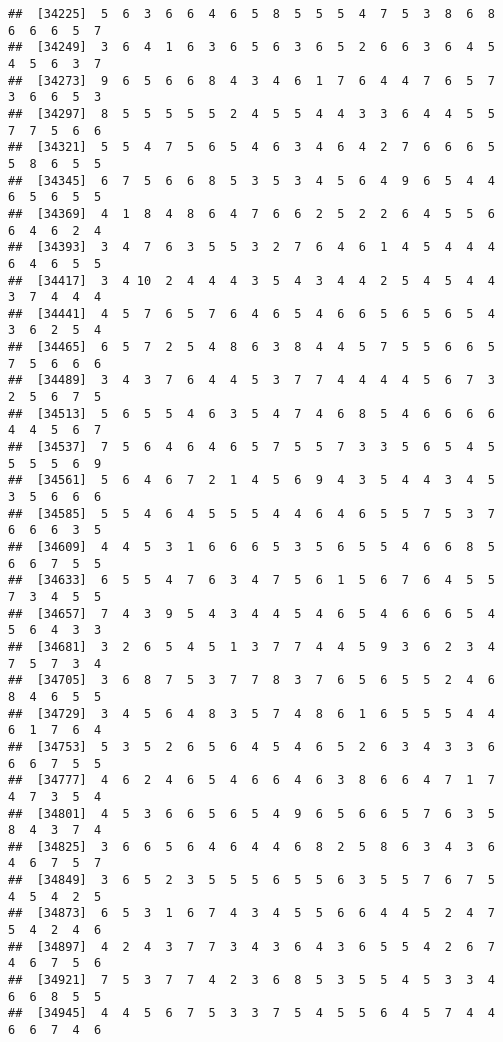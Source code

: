 \documentclass[
]{book}
\begin{document}
\begin{verbatim}
##  [34225]  5  6  3  6  6  4  6  5  8  5  5  5  4  7  5  3  8  6  8  6  6  6  5  7
##  [34249]  3  6  4  1  6  3  6  5  6  3  6  5  2  6  6  3  6  4  5  4  5  6  3  7
##  [34273]  9  6  5  6  6  8  4  3  4  6  1  7  6  4  4  7  6  5  7  3  6  6  5  3
##  [34297]  8  5  5  5  5  5  2  4  5  5  4  4  3  3  6  4  4  5  5  7  7  5  6  6
##  [34321]  5  5  4  7  5  6  5  4  6  3  4  6  4  2  7  6  6  6  5  5  8  6  5  5
##  [34345]  6  7  5  6  6  8  5  3  5  3  4  5  6  4  9  6  5  4  4  6  5  6  5  5
##  [34369]  4  1  8  4  8  6  4  7  6  6  2  5  2  2  6  4  5  5  6  6  4  6  2  4
##  [34393]  3  4  7  6  3  5  5  3  2  7  6  4  6  1  4  5  4  4  4  6  4  6  5  5
##  [34417]  3  4 10  2  4  4  4  3  5  4  3  4  4  2  5  4  5  4  4  3  7  4  4  4
##  [34441]  4  5  7  6  5  7  6  4  6  5  4  6  6  5  6  5  6  5  4  3  6  2  5  4
##  [34465]  6  5  7  2  5  4  8  6  3  8  4  4  5  7  5  5  6  6  5  7  5  6  6  6
##  [34489]  3  4  3  7  6  4  4  5  3  7  7  4  4  4  4  5  6  7  3  2  5  6  7  5
##  [34513]  5  6  5  5  4  6  3  5  4  7  4  6  8  5  4  6  6  6  6  4  4  5  6  7
##  [34537]  7  5  6  4  6  4  6  5  7  5  5  7  3  3  5  6  5  4  5  5  5  5  6  9
##  [34561]  5  6  4  6  7  2  1  4  5  6  9  4  3  5  4  4  3  4  5  3  5  6  6  6
##  [34585]  5  5  4  6  4  5  5  5  4  4  6  4  6  5  5  7  5  3  7  6  6  6  3  5
##  [34609]  4  4  5  3  1  6  6  6  5  3  5  6  5  5  4  6  6  8  5  6  6  7  5  5
##  [34633]  6  5  5  4  7  6  3  4  7  5  6  1  5  6  7  6  4  5  5  7  3  4  5  5
##  [34657]  7  4  3  9  5  4  3  4  4  5  4  6  5  4  6  6  6  5  4  5  6  4  3  3
##  [34681]  3  2  6  5  4  5  1  3  7  7  4  4  5  9  3  6  2  3  4  7  5  7  3  4
##  [34705]  3  6  8  7  5  3  7  7  8  3  7  6  5  6  5  5  2  4  6  8  4  6  5  5
##  [34729]  3  4  5  6  4  8  3  5  7  4  8  6  1  6  5  5  5  4  4  6  1  7  6  4
##  [34753]  5  3  5  2  6  5  6  4  5  4  6  5  2  6  3  4  3  3  6  6  6  7  5  5
##  [34777]  4  6  2  4  6  5  4  6  6  4  6  3  8  6  6  4  7  1  7  4  7  3  5  4
##  [34801]  4  5  3  6  6  5  6  5  4  9  6  5  6  6  5  7  6  3  5  8  4  3  7  4
##  [34825]  3  6  6  5  6  4  6  4  4  6  8  2  5  8  6  3  4  3  6  4  6  7  5  7
##  [34849]  3  6  5  2  3  5  5  5  6  5  5  6  3  5  5  7  6  7  5  4  5  4  2  5
##  [34873]  6  5  3  1  6  7  4  3  4  5  5  6  6  4  4  5  2  4  7  5  4  2  4  6
##  [34897]  4  2  4  3  7  7  3  4  3  6  4  3  6  5  5  4  2  6  7  4  6  7  5  6
##  [34921]  7  5  3  7  7  4  2  3  6  8  5  3  5  5  4  5  3  3  4  6  6  8  5  5
##  [34945]  4  4  5  6  7  5  3  3  7  5  4  5  5  6  4  5  7  4  4  6  6  7  4  6

\end{verbatim}
\end{document}
